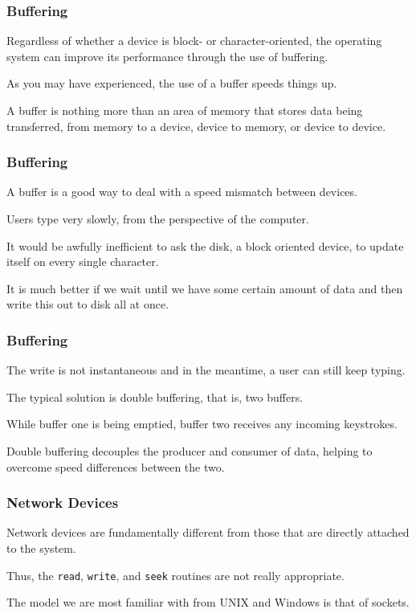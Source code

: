 \begin{frame}
\frametitle{Buffering}

Regardless of whether a device is block- or character-oriented, the operating system can improve its performance through the use of buffering. 

As you may have experienced, the use of a buffer speeds things up.

A buffer is nothing more than an area of memory that stores data being transferred, from memory to a device, device to memory, or device to device. 

\end{frame}

\begin{frame}
\frametitle{Buffering}

A buffer is a good way to deal with a speed mismatch between devices. 

Users type very slowly, from the perspective of the computer. 

It would be awfully inefficient to ask the disk, a block oriented device, to update itself on every single character. 

It is much better if we wait until we have some certain amount of data and then write this out to disk all at once.

\end{frame}

\begin{frame}
\frametitle{Buffering}

The write is not instantaneous and in the meantime, a user can still keep typing. 

The typical solution is \alert{double buffering}, that is, two buffers. 

While buffer one is being emptied, buffer two receives any incoming keystrokes. 

Double buffering decouples the producer and consumer of data, helping to overcome speed differences between the two.

\end{frame}

\begin{frame}
\frametitle{Network Devices}

Network devices are fundamentally different from those that are directly attached to the system. 

Thus, the \texttt{read}, \texttt{write}, and \texttt{seek} routines are not really appropriate. 

The model we are most familiar with from UNIX and Windows is that of \alert{sockets}.


\end{frame}


